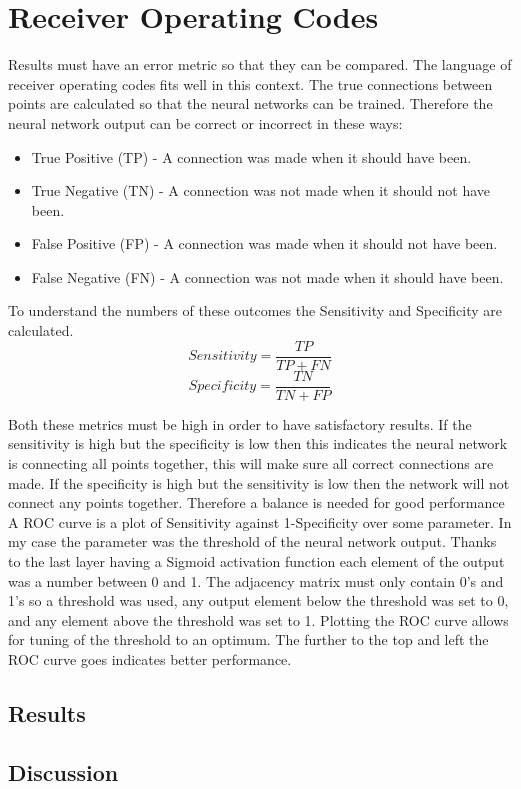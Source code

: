 \section{Receiver Operating Codes}
Results must have an error metric so that they can be compared. The language of receiver operating codes fits well in this context. The true connections between points are calculated so that the neural networks can be trained. Therefore the neural network output can be correct or incorrect in these ways:
\begin{itemize}
    \item True Positive (TP) - A connection was made when it should have been.
    \item True Negative (TN) - A connection was not made when it should not have been.
    \item False Positive (FP) - A connection was made when it should not have been.
    \item False Negative (FN) - A connection was not made when it should have been.
\end{itemize}
To understand the numbers of these outcomes the Sensitivity and Specificity are calculated.
\[ Sensitivity = \frac{TP}{TP + FN} \]
\[ Specificity = \frac{TN}{TN + FP} \]

Both these metrics must be high in order to have satisfactory results. If the sensitivity is high but the specificity is low then this indicates the neural network is connecting all points together, this will make sure all correct connections are made. If the specificity is high but the sensitivity is low then the network will not connect any points together. Therefore a balance is needed for good performance\\
A ROC curve is a plot of Sensitivity against 1-Specificity over some parameter. In my case the parameter was the threshold of the neural network output. Thanks to the last layer having a Sigmoid activation function each element of the output was a number between 0 and 1. The adjacency matrix must only contain 0's and 1's so a threshold was used, any output element below the threshold was set to 0, and any element above the threshold was set to 1. Plotting the ROC curve allows for tuning of the threshold to an optimum. The further to the top and left the ROC curve goes indicates better performance.
\textbf{}

\subsection{Results}

\subsection{Discussion}